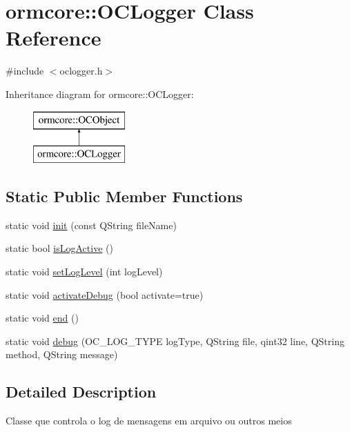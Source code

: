 \hypertarget{classormcore_1_1_o_c_logger}{
\section{ormcore\-:\-:\-O\-C\-Logger \-Class \-Reference}
\label{classormcore_1_1_o_c_logger}
}


{\ttfamily \#include $<$oclogger.\-h$>$}

\-Inheritance diagram for ormcore\-:\-:\-O\-C\-Logger\-:\begin{figure}[H]
\begin{center}
\leavevmode
\includegraphics[height=2.000000cm]{classormcore_1_1_o_c_logger}
\end{center}
\end{figure}
\subsection*{\-Static \-Public \-Member \-Functions}
\begin{DoxyCompactItemize}
\item 
static void \hyperlink{classormcore_1_1_o_c_logger_a3459e0daf8528bc1fa6ff2fee8f7ed7b}{init} (const \-Q\-String file\-Name)
\item 
static bool \hyperlink{classormcore_1_1_o_c_logger_a80761cdd34c1c2129781f0e10c49cc13}{is\-Log\-Active} ()
\item 
static void \hyperlink{classormcore_1_1_o_c_logger_a6b4ff14c85dfb0d9a5cfdb5de3e4c810}{set\-Log\-Level} (int log\-Level)
\item 
static void \hyperlink{classormcore_1_1_o_c_logger_a8ad195d1f7324577ab4d0da4c13bb311}{activate\-Debug} (bool activate=true)
\item 
static void \hyperlink{classormcore_1_1_o_c_logger_a0af956315f4126008eb02e38cca14ba7}{end} ()
\item 
static void \hyperlink{classormcore_1_1_o_c_logger_aaa72ada5c6981bc62367d0654f422607}{debug} (\-O\-C\-\_\-\-L\-O\-G\-\_\-\-T\-Y\-P\-E log\-Type, \-Q\-String file, qint32 line, \-Q\-String method, \-Q\-String message)
\end{DoxyCompactItemize}


\subsection{\-Detailed \-Description}
\-Classe que controla o log de mensagens em arquivo ou outros meios 

